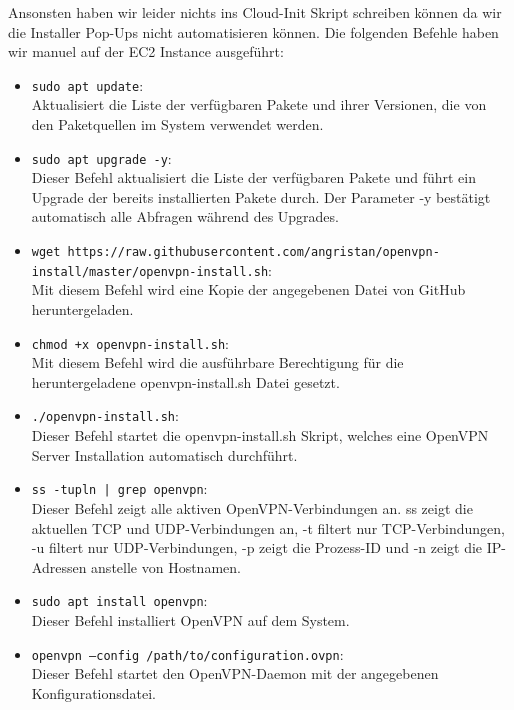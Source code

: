 \documentclass{article}
\begin{document}
\noindent Ansonsten haben wir leider nichts ins Cloud-Init Skript schreiben können da wir die Installer Pop-Ups nicht automatisieren können. Die folgenden Befehle haben wir manuel auf der EC2 Instance ausgeführt:

\begin{itemize}
\item \texttt{sudo apt update}: \\
Aktualisiert die Liste der verfügbaren Pakete und ihrer Versionen, die von den Paketquellen im System verwendet werden.

\item \texttt{sudo apt upgrade -y}: \\
Dieser Befehl aktualisiert die Liste der verfügbaren Pakete und führt ein Upgrade der bereits installierten Pakete durch. Der Parameter -y bestätigt automatisch alle Abfragen während des Upgrades.

\item \texttt{wget https://raw.githubusercontent.com/angristan/openvpn-install/master/openvpn-install.sh}: \\
Mit diesem Befehl wird eine Kopie der angegebenen Datei von GitHub heruntergeladen.

\item \texttt{chmod +x openvpn-install.sh}: \\
Mit diesem Befehl wird die ausführbare Berechtigung für die heruntergeladene openvpn-install.sh Datei gesetzt.

\item \texttt{./openvpn-install.sh}: \\
Dieser Befehl startet die openvpn-install.sh Skript, welches eine OpenVPN Server Installation automatisch durchführt.

\item \texttt{ss -tupln | grep openvpn}: \\
Dieser Befehl zeigt alle aktiven OpenVPN-Verbindungen an. ss zeigt die aktuellen TCP und UDP-Verbindungen an, -t filtert nur TCP-Verbindungen, -u filtert nur UDP-Verbindungen, -p zeigt die Prozess-ID und -n zeigt die IP-Adressen anstelle von Hostnamen.

\item \texttt{sudo apt install openvpn}: \\
Dieser Befehl installiert OpenVPN auf dem System.

\item \texttt{openvpn --config /path/to/configuration.ovpn}: \\
Dieser Befehl startet den OpenVPN-Daemon mit der angegebenen Konfigurationsdatei.


\end{itemize}
\end{document}

